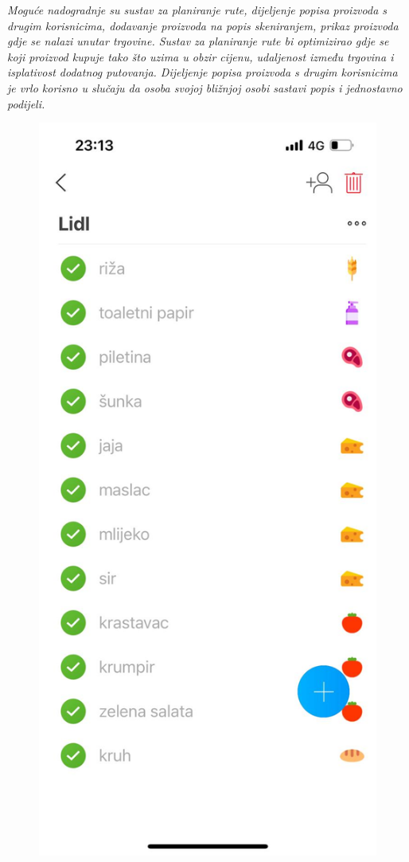 		\textit{Moguće nadogradnje su sustav za planiranje rute, dijeljenje popisa proizvoda s drugim korisnicima, dodavanje proizvoda na popis skeniranjem, prikaz proizvoda gdje se nalazi unutar trgovine. Sustav za planiranje rute bi optimizirao gdje se koji proizvod kupuje tako što uzima u obzir cijenu, udaljenost između trgovina i isplativost dodatnog putovanja. Dijeljenje popisa proizvoda s drugim korisnicima je vrlo korisno u slučaju da osoba svojoj bližnjoj osobi sastavi popis i jednostavno podijeli.}\\
		
		\begin{figure}[h]
			\begin{minipage}[t]{0.4\linewidth}
			\includegraphics[width = \linewidth]{slike/listonic_primjer.JPEG}

\end{minipage}
\end{figure}
